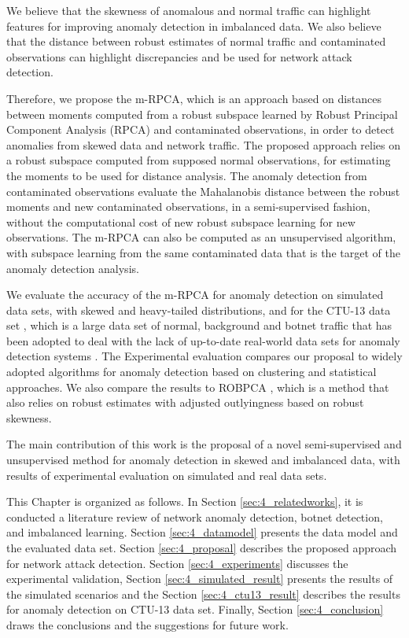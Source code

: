 We believe that the skewness of anomalous and normal traffic can highlight features for improving anomaly detection in imbalanced data. We also believe that the distance between robust estimates of normal traffic and contaminated observations can highlight discrepancies and be used for network attack detection. 

Therefore, we propose the m-RPCA, which is an approach based on distances between moments computed from a robust subspace learned by Robust Principal Component Analysis (RPCA) and contaminated observations, in order to detect anomalies from skewed data and network traffic. The proposed approach relies on a robust subspace computed from supposed normal observations, for estimating the moments to be used for distance analysis. The anomaly detection from contaminated observations evaluate the Mahalanobis distance between the robust moments and new contaminated observations, in a semi-supervised fashion, without the computational cost of new robust subspace learning for new observations. The m-RPCA can also be computed as an unsupervised algorithm, with subspace learning from the same contaminated data that is the target of the anomaly detection analysis.

We evaluate the accuracy of the m-RPCA for anomaly detection on simulated data sets, with skewed and heavy-tailed distributions, and for the CTU-13 data set \cite{garcia2014empirical}, which is a large data set of normal, background and botnet traffic that has been adopted to deal with the lack of up-to-date real-world data sets for anomaly detection systems \cite{osanaiye2016distributed}. The Experimental evaluation compares our proposal to widely adopted algorithms for anomaly detection based on clustering and statistical approaches. We also compare the results to ROBPCA \cite{hubert2005robpca}, which is a method that also relies on robust estimates with adjusted outlyingness based on robust skewness.

The main contribution of this work is the proposal of a novel semi-supervised and unsupervised method for anomaly detection in skewed and imbalanced data, with results of experimental evaluation on simulated and real data sets.

This Chapter is organized as follows. In Section \ref{sec:4_relatedworks}, it is conducted a literature review of network anomaly detection, botnet detection, and imbalanced learning. Section \ref{sec:4_datamodel} presents the data model and the evaluated data set. Section \ref{sec:4_proposal} describes the proposed approach for network attack detection. Section \ref{sec:4_experiments} discusses the experimental validation, Section \ref{sec:4_simulated_result} presents the results of the simulated scenarios and the Section \ref{sec:4_ctu13_result} describes the results for anomaly detection on CTU-13 data set. Finally, Section \ref{sec:4_conclusion} draws the conclusions and the suggestions for future work.


